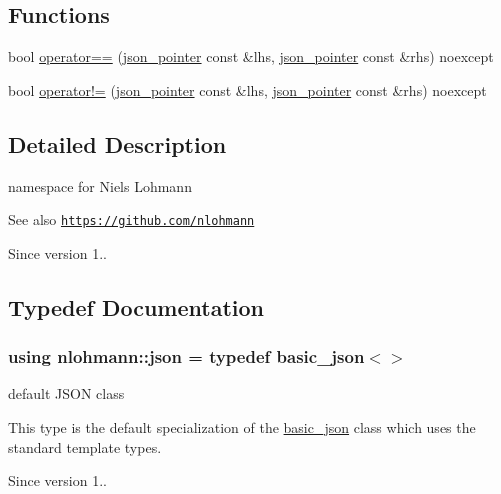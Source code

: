 \subsection*{Functions}
\begin{DoxyCompactItemize}
\item 
bool \hyperlink{namespacenlohmann_ab6e16643bf41fc07de3aaa349967d5ef}{operator==} (\hyperlink{classnlohmann_1_1json__pointer}{json\+\_\+pointer} const \&lhs, \hyperlink{classnlohmann_1_1json__pointer}{json\+\_\+pointer} const \&rhs) noexcept
\item 
bool \hyperlink{namespacenlohmann_a455cdb20f9efd12811ec2f6d367e28a5}{operator!=} (\hyperlink{classnlohmann_1_1json__pointer}{json\+\_\+pointer} const \&lhs, \hyperlink{classnlohmann_1_1json__pointer}{json\+\_\+pointer} const \&rhs) noexcept
\end{DoxyCompactItemize}


\subsection{Detailed Description}
namespace for Niels Lohmann 

\begin{DoxySeeAlso}{See also}
\href{https://github.com/nlohmann}{\tt https\+://github.\+com/nlohmann} 
\end{DoxySeeAlso}
\begin{DoxySince}{Since}
version 1.. 
\end{DoxySince}


\subsection{Typedef Documentation}
\subsubsection[{\texorpdfstring{json}{json}}]{\setlength{\rightskip}{0pt plus 5cm}using {\bf nlohmann\+::json} = typedef {\bf basic\+\_\+json}$<$$>$}\hypertarget{namespacenlohmann_a2bfd99e845a2e5cd90aeaf1b1431f474}{}\label{namespacenlohmann_a2bfd99e845a2e5cd90aeaf1b1431f474}


default J\+S\+ON class 

This type is the default specialization of the \hyperlink{classnlohmann_1_1basic__json}{basic\+\_\+json} class which uses the standard template types.

\begin{DoxySince}{Since}
version 1.. 
\end{DoxySince}


